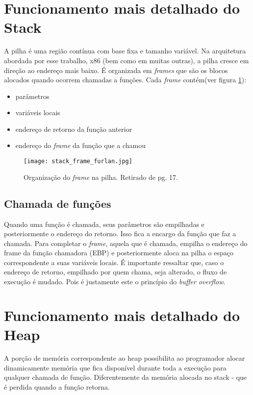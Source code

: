 	\section{Funcionamento mais detalhado do Stack}
	A pilha é uma região contínua com base fixa e tamanho variável.
	Na arquitetura abordada por esse trabalho, x86 (bem como em muitas outras), a pilha cresce
	em direção ao endereço mais baixo. É organizada em \textsl{frames} que são os blocos
	alocados quando ocorrem chamadas a funções. Cada \textsl{frame} contém(ver figura \ref{fig:stack_frame}):
	\begin{itemize}
		\item parâmetros
		\item variáveis locais
		\item endereço de retorno da função anterior
		\item endereço do \textsl{frame} da função que a chamou
	\end{itemize}

	\begin{figure}
		\begin{center}
		\texttt{[image: stack\_frame\_furlan.jpg]}
		\caption{Organização do \textsl{frame} na pilha. Retirado de \cite{Furlan2005} pg. 17.}
		\label{fig:stack_frame}
		\end{center}
	\end{figure}

	\subsection{Chamada de funções}
	Quando uma função é chamada, seus parâmetros são empilhadas e posteriormente o endereço
	do retorno. Isso fica a encargo da função que faz a chamada.
	Para completar o \textsl{frame}, aquela que é chamada, empilha o endereço do frame da função chamadora
	(EBP) e posteriormente aloca na pilha o espaço correspondente a suas variáveis locais.
	É importante ressaltar que, caso o endereço de retorno, empilhado por quem chama, seja alterado,
	o fluxo de execução é mudado. Pois é justamente este o princípio do \textsl{buffer overflow}.

	\section{Funcionamento mais detalhado do Heap}
	A porção de memória correspondente ao heap possibilita ao programador alocar dinamicamente memória
	que fica disponível durante toda a execução para qualquer chamada de função. Diferentemente
	da memória alocada no stack - que é perdida quando a função retorna.

